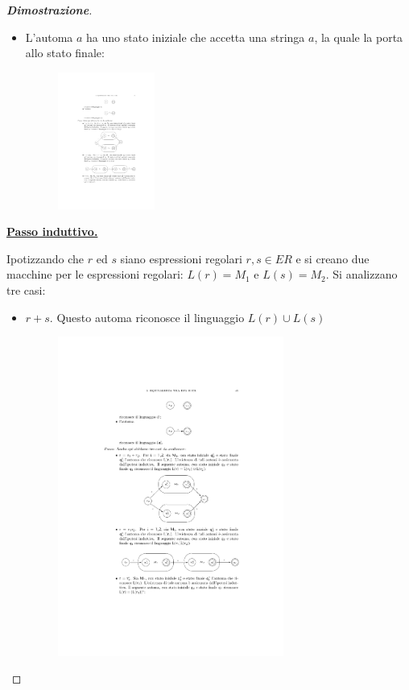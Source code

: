 \documentclass[a4paper]{article}
\begin{document}
\begin{proof}[\textbf{Dimostrazione}]
\begin{itemize}
			\item L'automa $a$ ha uno stato iniziale che accetta una stringa $a$, la quale la porta allo stato finale:
				\begin{figure}[!htp]
				\centering
				\includegraphics[width=0.3\textwidth]{img/teorema_McN-Yamada3.pdf}
			\end{figure}
		\end{itemize}
	
		\newpage
	
		\noindent
		\textbf{\underline{Passo induttivo.}}\newline
		
		\noindent
		Ipotizzando che $r$ ed $s$ siano espressioni regolari $r,s \in ER$ e si creano due macchine per le espressioni regolari: $L\left(r\right) = M_{1}$ e $L\left(s\right) = M_{2}$. Si analizzano tre casi:
		
		\begin{itemize}
			\item $r + s$. Questo automa riconosce il linguaggio $L\left(r\right) \cup L\left(s\right)$
				\begin{figure}[!htp]
					\centering
					\includegraphics[width=0.7\textwidth]{img/teorema_McN-Yamada4.pdf}
				\end{figure}
			

\end{itemize}
\end{proof}
\end{document}
